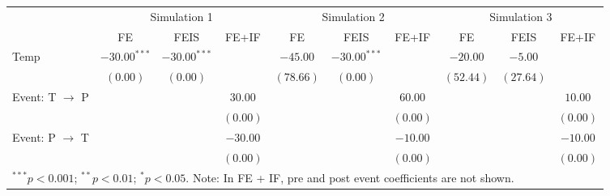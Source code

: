 
\begin{tabular}{l c c c c c c c c c}
\toprule
 & \multicolumn{3}{c}{Simulation 1} & \multicolumn{3}{c}{Simulation 2} & \multicolumn{3}{c}{Simulation 3} \\
\cmidrule(lr){2-4} \cmidrule(lr){5-7} \cmidrule(lr){8-10}
 & FE & FEIS & FE+IF & FE & FEIS & FE+IF & FE & FEIS & FE+IF \\
\midrule
Temp                     & $-30.00^{***}$ & $-30.00^{***}$ &          & $-45.00$  & $-30.00^{***}$ &          & $-20.00$  & $-5.00$   &          \\
                         & $(0.00)$       & $(0.00)$       &          & $(78.66)$ & $(0.00)$       &          & $(52.44)$ & $(27.64)$ &          \\
Event: T $\rightarrow$ P &                &                & $30.00$  &           &                & $60.00$  &           &           & $10.00$  \\
                         &                &                & $(0.00)$ &           &                & $(0.00)$ &           &           & $(0.00)$ \\
Event: P $\rightarrow$ T &                &                & $-30.00$ &           &                & $-10.00$ &           &           & $-10.00$ \\
                         &                &                & $(0.00)$ &           &                & $(0.00)$ &           &           & $(0.00)$ \\
\bottomrule
\multicolumn{10}{l}{\scriptsize{$^{***}p<0.001$; $^{**}p<0.01$; $^{*}p<0.05$. Note: In FE + IF, pre and post event coefficients are not shown.}}
\end{tabular}
